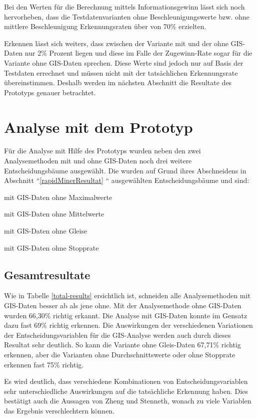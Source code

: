Bei den Werten für die Berechnung mittels Informationsgewinn lässt sich noch hervorheben, dass die Testdatenvarianten ohne Beschleunigungswerte bzw. ohne mittlere Beschleunigung Erkennungsraten über von 70\% erzielten. 

Erkennen lässt sich weiters, dass zwischen der Variante mit und der ohne GIS-Daten nur 2\% Prozent liegen und diese im Falle der Zugewinn-Rate sogar für die Variante ohne GIS-Daten sprechen. Diese Werte sind jedoch nur auf Basis der Testdaten errechnet und müssen nicht mit der tatsächlichen Erkennungsrate übereinstimmen. Deshalb werden im nächsten Abschnitt die Resultate des Prototyps genauer betrachtet.

\section{Analyse mit dem Prototyp}
Für die Analyse mit Hilfe des Prototyps wurden neben den zwei Analysemethoden mit und ohne GIS-Daten noch drei weitere Entscheidungsbäume ausgewählt. Die wurden auf Grund ihres Abschneidens in Abschnitt ``\ref{rapidMinerResultat} `` ausgewählten Entscheidungsbäume und sind:

\begin{pitemize}
\item mit GIS-Daten ohne Maximalwerte
\item mit GIS-Daten ohne Mittelwerte
\item mit GIS-Daten ohne Gleise
\item mit GIS-Daten ohne Stopprate
\end{pitemize}

\subsection{Gesamtresultate}
Wie in Tabelle \ref{total-results} ersichtlich ist, schneiden alle Analysemethoden mit GIS-Daten besser ab als jene ohne. Mit der Analysemethode ohne GIS-Daten wurden  66,30\% richtig erkannt. Die Analyse mit GIS-Daten konnte im Gensatz dazu fast 69\% richtig erkennen. Die Auswirkungen der verschiedenen Variationen der Entscheidungsvariablen für die GIS-Analyse werden auch durch dieses Resultat sehr deutlich. So kann die Variante ohne Gleis-Daten 67,71\% richtig erkennen, aber die Varianten ohne Durchschnittswerte oder ohne Stopprate erkennen fast 75\% richtig.

Es wird deutlich, dass verschiedene Kombinationen von Entscheidungsvariablen sehr unterschiedliche Auswirkungen auf die tatsächliche Erkennung haben. Dies bestätigt auch die Aussagen von Zheng und Stenneth, wonach zu viele Variablen das Ergebnis verschlechtern können. \cite{zheng_understanding_2010} \cite{stenneth_transportation_2011}

